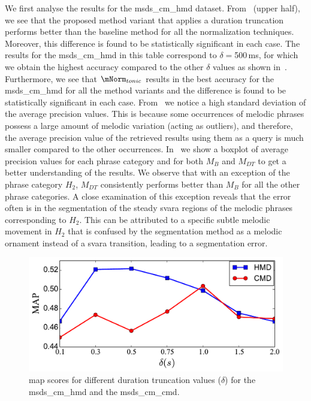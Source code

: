 We first analyse the results for the \acrshort{msds_cm_hmd} dataset. From~ (upper half), we see that the proposed method variant that applies a duration truncation performs better than the baseline method for all the normalization techniques. Moreover, this difference is found to be statistically significant in each case. The results  for the \acrshort{msds_cm_hmd} in this table correspond to $\delta=$500\,ms, for which we obtain the highest accuracy compared to the other $\delta$ values as shown in~. Furthermore, we see that $\mNorm_{tonic}$ results in the best accuracy for the \acrshort{msds_cm_hmd} for all the method variants and the difference is found to be statistically significant in each case. From~ we notice a high standard deviation of the average precision values. This is because some occurrences of melodic phrases possess a large amount of melodic variation (acting as outliers), and therefore, the average precision value of the retrieved results using them as a query is much smaller compared to the other occurrences. In~ we show a boxplot of average precision values for each phrase category and for both $M_B$ and $M_{DT}$ to get a better understanding of the results. We observe that with an exception of the phrase category $H_2$, $M_{DT}$ consistently performs better than $M_B$ for all the other phrase categories. A close examination of this exception reveals that the error often is in the segmentation of the steady \gls{svara} regions of the melodic phrases corresponding to $H_2$. This can be attributed to a specific subtle melodic movement in $H_2$ that is confused by the segmentation method as a melodic ornament instead of a \gls{svara} transition, leading to a segmentation error. 


\begin{figure}
	\begin{center}
		\includegraphics[width=\figSizeEightyFive]{ch06_patterns/figures/ImprovingSimilarity/MAP_per_Duration_Truncation.pdf}
	\end{center}
	\caption{\gls{map} scores for different duration truncation values ($\delta$) for the \acrshort{msds_cm_hmd} and the \acrshort{msds_cm_cmd}.} 
	\label{fig:map_per_duration_truncation}
\end{figure}

